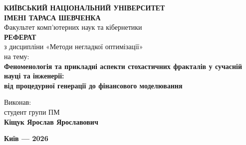 \documentclass[14pt,a4paper,oneside]{extarticle}
\begin{document}
\begin{titlepage}
\thispagestyle{empty}
\begin{center}
{\Large \textbf{КИЇВСЬКИЙ НАЦІОНАЛЬНИЙ УНІВЕРСИТЕТ\\
ІМЕНІ ТАРАСА ШЕВЧЕНКА}}\\[2\baselineskip]
{\large Факультет комп'ютерних наук та кібернетики}\\[3\baselineskip]
{\Large \textbf{РЕФЕРАТ}}\\[0.75\baselineskip]
{\normalsize з дисципліни «Методи негладкої оптимізації»}\\[2.5\baselineskip]
{\normalsize на тему:}\\[0.75\baselineskip]
{\large \textbf{Феноменологія та прикладні аспекти стохастичних фракталів у сучасній науці та інженерії:\\від процедурної генерації до фінансового моделювання}}\\[4\baselineskip]
\end{center}
\begin{flushright}
Виконав:\\[0.25\baselineskip]
студент групи ПМ\\[0.4\baselineskip]
{\Large \textbf{Кіщук Ярослав Ярославович}}\\[2\baselineskip]
\end{flushright}
\vfill
\begin{center}
{\large \textbf{Київ --- 2026}}
\end{center}
\end{titlepage}
\clearpage

\begin{abstract}
Розглянуто перехід від евклідової геометрії до фрактальної парадигми, роль стохастичних компонент у самоподібних структурах та прикладні галузі: комп'ютерна графіка й ландшафти, фрактальне стиснення зображень, біологія й медицина, фрактальні антени, гіпотеза фрактального ринку, дифузійно-обмежена агрегація, стохастичний фрактальний пошук, метеорологія.
\end{abstract}
\clearpage

\tableofcontents
\clearpage

\nocite{c01,c02,c03,c04,c05,c06,c07,c08,c09,c10,c11,c12,c13,c14,c15,c16,c17,c18,c19,c20,c21,c22,c23,c24,c25,c26,c27,c28,c29,c30,c31,c32,c33,c34,c35,c36,c37,c38,c39,c40,c41,c42,c43,c44,c45,c46,c47,c52}
\end{document}
